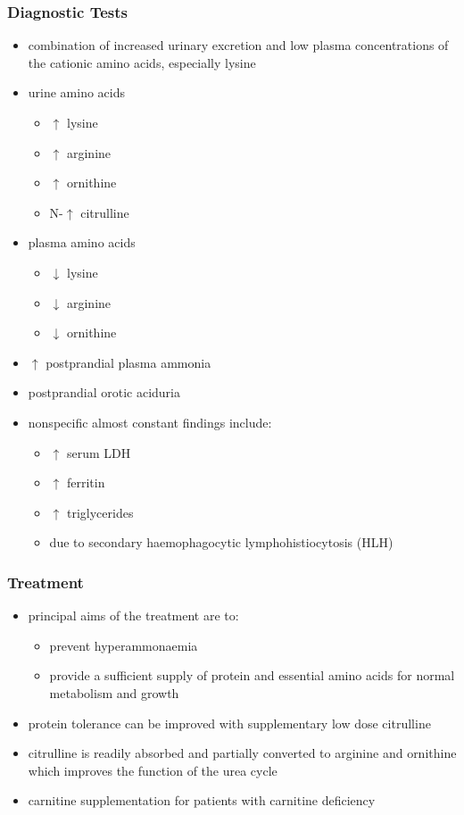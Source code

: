 \documentclass{scrartcl}
\begin{document}
\subsubsection{Diagnostic Tests}
\label{sec:org9169b9d}
\begin{itemize}
\item combination of increased urinary excretion and low plasma
concentrations of the cationic amino acids, especially lysine
\item urine amino acids
\begin{itemize}
\item \(\uparrow\) lysine
\item \(\uparrow\) arginine
\item \(\uparrow\) ornithine
\item N-\(\uparrow\) citrulline
\end{itemize}
\item plasma amino acids
\begin{itemize}
\item \(\downarrow\) lysine
\item \(\downarrow\) arginine
\item \(\downarrow\) ornithine
\end{itemize}
\item \(\uparrow\) postprandial plasma ammonia
\item postprandial orotic aciduria
\item nonspecific almost constant findings include:
\begin{itemize}
\item \(\uparrow\) serum LDH
\item \(\uparrow\) ferritin
\item \(\uparrow\) triglycerides
\item due to secondary haemophagocytic lymphohistiocytosis (HLH)
\end{itemize}
\end{itemize}

\subsubsection{Treatment}
\label{sec:orgd5770c6}
\begin{itemize}
\item principal aims of the treatment are to:
\begin{itemize}
\item prevent hyperammonaemia
\item provide a sufficient supply of protein and essential amino acids
for normal metabolism and growth
\end{itemize}

\item protein tolerance can be improved with supplementary low dose
citrulline
\item citrulline is readily absorbed and partially converted to arginine
and ornithine which improves the function of the urea cycle
\item carnitine supplementation for patients with carnitine deficiency
\end{itemize}
\end{document}
